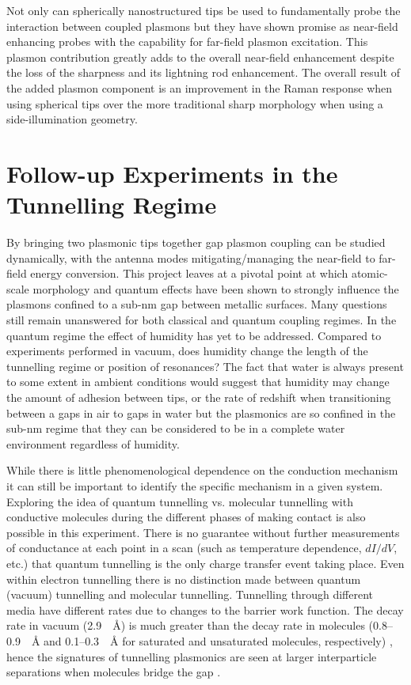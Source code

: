 \documentclass[12pt, a4paper, twoside]{book}
\begin{document}
Not only can spherically nanostructured tips be used to fundamentally probe the interaction between coupled plasmons but they have shown promise as near-field enhancing probes with the capability for far-field plasmon excitation. This plasmon contribution greatly adds to the overall near-field enhancement despite the loss of the sharpness and its lightning rod enhancement. The overall result of the added plasmon component is an improvement in the Raman response when using spherical tips over the more traditional sharp morphology when using a side-illumination geometry.

\section{Follow-up Experiments in the Tunnelling Regime}

By bringing two plasmonic tips together gap plasmon coupling can be studied dynamically, with the antenna modes mitigating/managing the near-field to far-field energy conversion.
This project leaves at a pivotal point at which atomic-scale morphology and quantum effects have been shown to strongly influence the plasmons confined to a sub-nm gap between metallic surfaces.
Many questions still remain unanswered for both classical and quantum coupling regimes.
In the quantum regime the effect of humidity has yet to be addressed. Compared to experiments performed in vacuum, does humidity change the length of the tunnelling regime or position of resonances? The fact that water is always present to some extent in ambient conditions would suggest that humidity may change the amount of adhesion between tips, or the rate of redshift when transitioning between a gaps in air to gaps in water but the plasmonics are so confined in the sub-nm regime that they can be considered to be in a complete water environment regardless of humidity.

While there is little phenomenological dependence on the conduction mechanism it can still be important to identify the specific mechanism in a given system. Exploring the idea of quantum tunnelling vs. molecular tunnelling with conductive molecules during the different phases of making contact is also possible in this experiment. There is no guarantee without further measurements of conductance at each point in a scan (such as temperature dependence, $dI/dV$, etc.) that quantum tunnelling is the only charge transfer event taking place. Even within electron tunnelling there is no distinction made between quantum (vacuum) tunnelling and molecular tunnelling.  Tunnelling through different media have different rates due to changes to the barrier work function. The decay rate in vacuum (\SI{2.9}{\per\angstrom}) is much greater than the decay rate in molecules (0.8--\SI{0.9}{\per\angstrom} and 0.1--\SI{0.3}{\per\angstrom} for saturated and unsaturated molecules, respectively) \cite{tan2014}, hence the signatures of tunnelling plasmonics are seen at larger interparticle separations when molecules bridge the gap \cite{tan2014, benz2014}.
\end{document}
